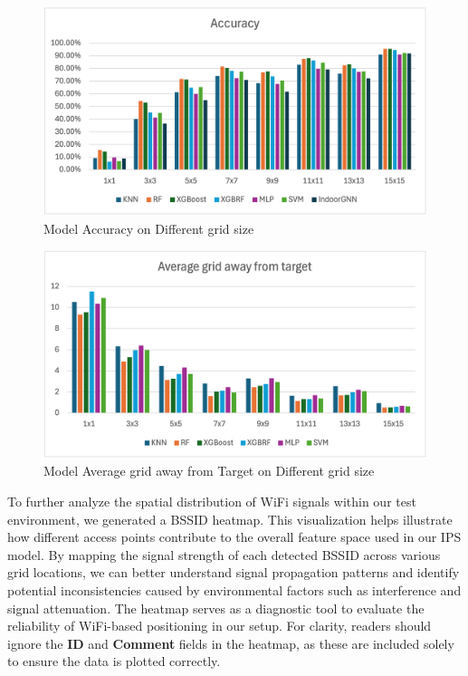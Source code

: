 \documentclass[conference]{IEEEtran}
\begin{document}
	\begin{figure}[htbp]
		\centerline{\includegraphics[scale=0.65]{image3.png}}
		\caption{Model Accuracy on Different grid size}
		\label{fig1}
	\end{figure}
	
	\begin{figure}[htbp]
		\centerline{\includegraphics[scale=0.65]{image1.png}}
		\caption{Model Average grid away from Target on Different grid size}
		\label{fig2}
	\end{figure}
	
	To further analyze the spatial distribution of WiFi signals within our test environment, we generated a BSSID heatmap. This visualization helps illustrate how different access points contribute to the overall feature space used in our IPS model. By mapping the signal strength of each detected BSSID across various grid locations, we can better understand signal propagation patterns and identify potential inconsistencies caused by environmental factors such as interference and signal attenuation. The heatmap serves as a diagnostic tool to evaluate the reliability of WiFi-based positioning in our setup. For clarity, readers should ignore the \textbf{ID} and \textbf{Comment} fields in the heatmap, as these are included solely to ensure the data is plotted correctly.
	
\end{document}
